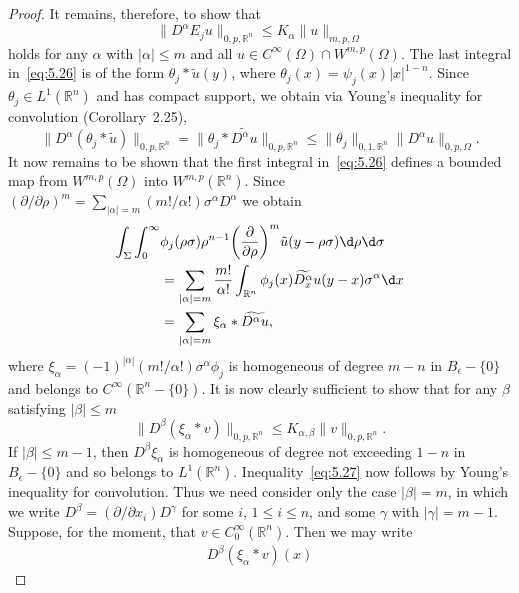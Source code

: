 \begin{proof}
  It remains, therefore, to show that
  \[ \|D^\alpha E_j u\|_{0,p,\mathbb{R}^n} \leq K_{\alpha} \|u\|_{m,p,\Omega} \]
  holds for any $\alpha$ with $|\alpha|\leq m$ and all
  $u\in C^\infty(\Omega)\cap W^{m,p}(\Omega)$. The last integral in~\eqref{eq:5.26}
  is of the form $\theta_j * \tilde u(y)$, where $\theta_j(x) = \psi_j(x)|x|^{1-n}$.
  Since $\theta_j\in L^1(\mathbb{R}^n)$ and has compact support, we obtain via
  Young's inequality for convolution (Corollary~2.25),
  \[ \|D^{\alpha} (\theta_j * \tilde u)\|_{0,p,\mathbb{R}^n}
      = \|\theta_j * \widetilde{D^{\alpha} u} \|_{0,p,\mathbb{R}^n}
      \leq \|\theta_j\|_{0,1,\mathbb{R}^n} \|D^{\alpha} u\|_{0,p,\Omega}. \]
  It now remains to be shown that the first integral in~\eqref{eq:5.26}
  defines a bounded map from $W^{m,p}(\Omega)$ into $W^{m,p}(\mathbb{R}^n)$.
  Since $(\partial/\partial\rho)^m = \sum_{|\alpha|=m} (m!/\alpha!)\sigma^{\alpha} D^{\alpha}$
  we obtain
  \begin{align*}
    \int_{\Sigma} \int_0^\infty
    & \phi_j (\rho\sigma) \rho^{n-1} \biggl(\frac{\partial}{\partial\rho}\biggr)^m
      \tilde{u}(y-\rho\sigma) \d\rho \d\sigma \\
    & = \sum_{|\alpha|=m} \frac{m!}{\alpha!} \int_{\mathbb{R}^n}
      \phi_j(x) \widetilde{D_x^{\alpha}} u(y-x) \sigma^{\alpha} \d x \\
    & = \sum_{|\alpha|=m} \xi_{\alpha} * \widetilde{D^{\alpha} u},
  \end{align*}
  where $\xi_{\alpha} = (-1)^{|\alpha|} (m!/\alpha!)\sigma^{\alpha} \phi_j$
  is homogeneous of degree $m-n$ in $B_{\epsilon} - \{0\}$ and belongs
  to $C^{\infty}(\mathbb{R}^n - \{0\})$. It is now clearly sufficient
  to show that for any $\beta$ satisfying $|\beta|\leq m$
  \begin{equation}\label{eq:5.27}
    \|D^{\beta} (\xi_{\alpha} * v)\|_{0,p,\mathbb{R}^n}
    \leq K_{\alpha,\beta} \|v\|_{0,p,\mathbb{R}^n}.
  \end{equation}
  If $|\beta|\leq m-1$, then $D^{\beta} \xi_{\alpha}$ is homogeneous
  of degree not exceeding $1-n$ in $B_{\epsilon} - \{0\}$ and so belongs
  to $L^1(\mathbb{R}^n)$. Inequality~\eqref{eq:5.27} now follows by
  Young's inequality for convolution. Thus we need consider only the case
  $|\beta|=m$, in which we write $D^{\beta} = (\partial/\partial x_i) D^{\gamma}$
  for some $i$, $1\leq i\leq n$, and some $\gamma$ with $|\gamma|=m-1$.
  Suppose, for the moment, that $v\in C_0^{\infty}(\mathbb{R}^n)$.
  Then we may write
  \begin{align*}
    D^{\beta} (\xi_{\alpha} * v)(x)

\end{align*}
\end{proof}
